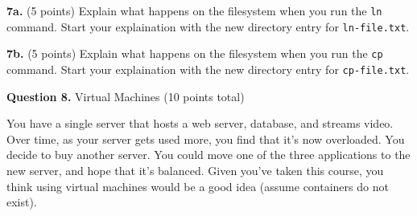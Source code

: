 \documentclass[12pt]{article}
\begin{document}
\vspace{1em}

\textbf{7a.} (5 points)
Explain what happens on the filesystem when you run the \texttt{ln} command.
Start your explaination with the new directory entry for \texttt{ln-file.txt}.


\textbf{7b.} (5 points)
Explain what happens on the filesystem when you run the \texttt{cp} command.
Start your explaination with the new directory entry for \texttt{cp-file.txt}.


\newpage

\textbf{Question 8.} Virtual Machines (10 points total)

\vspace{1em}

You have a single server that hosts a web server, database, and streams video.
Over time, as your server gets used more, you find that it's now overloaded.
You decide to buy another server.
You could move one of the three applications to the new server, and hope that
it's balanced.
Given you've taken this course, you think using virtual machines would be a good
idea (assume containers do not exist).

\vspace{1em}
\end{document}

